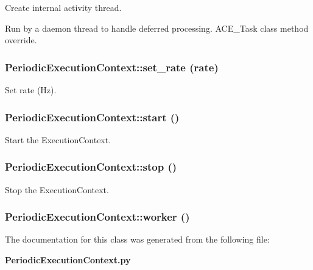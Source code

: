 Create internal activity thread. 

Run by a daemon thread to handle deferred processing. ACE\_\-Task class method override.
\subsubsection{\setlength{\rightskip}{0pt plus 5cm}Periodic\-Execution\-Context::set\_\-rate (rate)}\label{classPeriodicExecutionContext_PeriodicExecutionContexta23}


Set rate (Hz). 

\subsubsection{\setlength{\rightskip}{0pt plus 5cm}Periodic\-Execution\-Context::start ()}\label{classPeriodicExecutionContext_PeriodicExecutionContexta20}


Start the Execution\-Context. 

\subsubsection{\setlength{\rightskip}{0pt plus 5cm}Periodic\-Execution\-Context::stop ()}\label{classPeriodicExecutionContext_PeriodicExecutionContexta21}


Stop the Execution\-Context. 

\subsubsection{\setlength{\rightskip}{0pt plus 5cm}Periodic\-Execution\-Context::worker ()}\label{classPeriodicExecutionContext_PeriodicExecutionContexta12}




The documentation for this class was generated from the following file:\begin{CompactItemize}
\item 
{\bf Periodic\-Execution\-Context.py}\end{CompactItemize}
